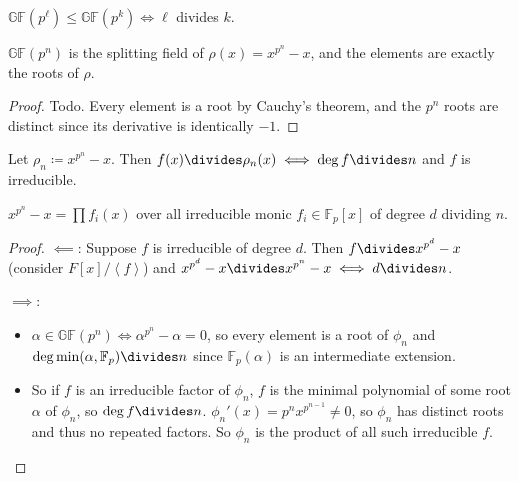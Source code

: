\begin{proposition}

\({\mathbb{GF}}(p^\ell) \leq {\mathbb{GF}}(p^k) \iff \ell\) divides
\(k\).

\end{proposition}

\begin{proposition}

\({\mathbb{GF}}(p^n)\) is the splitting field of
\(\rho(x) = x^{p^n} - x\), and the elements are exactly the roots of
\(\rho\).

\end{proposition}

\begin{proof}

Todo. Every element is a root by Cauchy's theorem, and the \(p^n\) roots
are distinct since its derivative is identically \(-1\).

\end{proof}

\begin{proposition}

Let \(\rho_n \coloneqq x^{p^n} - x\). Then
\(f(x) \divides \rho_n(x) \iff \deg f \divides n\) and \(f\) is
irreducible.

\end{proposition}

\begin{corollary}

\(x^{p^n} - x = \prod f_i(x)\) over all irreducible monic
\(f_i \in {\mathbb{F}}_p[x]\) of degree \(d\) dividing \(n\).

\end{corollary}

\begin{proof}

\(\impliedby\): Suppose \(f\) is irreducible of degree \(d\). Then
\(f \divides x^{p^d} - x\) (consider
\(F[x]/\left\langle{f}\right\rangle\)) and
\(x^{p^d} - x \divides x^{p^n} - x \iff d\divides n\).

\(\implies\):

\begin{itemize}
\item
  \(\alpha \in {\mathbb{GF}}(p^n) \iff \alpha^{p^n} - \alpha = 0\), so
  every element is a root of \(\phi_n\) and
  \(\deg \min(\alpha, {\mathbb{F}}_p) \divides n\) since
  \({\mathbb{F}}_p(\alpha)\) is an intermediate extension.
\item
  So if \(f\) is an irreducible factor of \(\phi_n\), \(f\) is the
  minimal polynomial of some root \(\alpha\) of \(\phi_n\), so
  \(\deg f \divides n\). \(\phi_n'(x) = p^nx^{p^{n-1}} \neq 0\), so
  \(\phi_n\) has distinct roots and thus no repeated factors. So
  \(\phi_n\) is the product of all such irreducible \(f\).
\end{itemize}

\end{proof}

